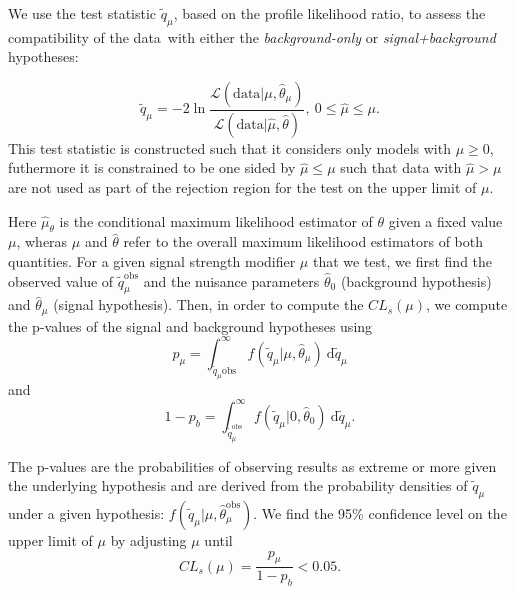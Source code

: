 We use the test statistic $\tilde{q}_\mu$, based on the profile likelihood ratio\cite{Cowan:2010js}, to assess the compatibility of the data with either the \textit{background-only} or \textit{signal+background} hypotheses:

\begin{equation}
\tilde{q}_\mu = -2 \ln{\frac{\mathcal{L}(\mathrm{data} | \mu, \hat{\theta}_\mu)}{\mathcal{L}(\mathrm{data} | \hat{\mu}, \hat{\theta})}},\ 0 \le \hat{\mu} \le \mu.
\end{equation}
This test statistic is constructed such that it considers only models with $\mu \ge 0$, futhermore it is constrained to be one sided by $\hat{\mu} \le \mu$ such that data with $\hat{\mu} > \mu$ are not used as part of the rejection region for the test on the upper limit of $\mu$.

Here $\hat{\mu}_\theta$ is the conditional maximum likelihood estimator of $\theta$ given a fixed value $\mu$, wheras $\hat{\mu}$ and $\hat{\theta}$ refer to the overall maximum likelihood estimators of both quantities. For a given signal strength modifier $\mu$ that we test, we first find the observed value of $\tilde{q}_\mu^{\mathrm{obs}}$ and the nuisance parameters $\hat{\theta}_0$ (background hypothesis) and $\hat{\theta}_\mu$ (signal hypothesis). Then, in order to compute the $CL_s(\mu)$, we compute the p-values of the signal and background hypotheses using
\begin{equation}
p_{\mu} = \int_{\tilde{q}_{\mu}{\mathrm{obs}}}^\infty f(\tilde{q}_{\mu} | \mu, \hat{\theta}_{\mu})\ \mathrm{d}\tilde{q}_\mu
\end{equation}
and
\begin{equation}
1 - p_b = \int_{\tilde{q}_{\mu}^{\mathrm{obs}}}^\infty f(\tilde{q}_{\mu} | 0, \hat{\theta}_0)\ \mathrm{d}\tilde{q}_{\mu}.
\end{equation}

The p-values are the probabilities of observing results as extreme or more given the underlying hypothesis and are derived from the probability densities of $\tilde{q}_{\mu}$ under a given hypothesis: $f(\tilde{q}_\mu | \mu, \hat{\theta}_\mu^{\mathrm{obs}})$. We find the 95\% confidence level on the upper limit of $\mu$ by adjusting $\mu$ until
\begin{equation}
CL_s(\mu) = \frac{p_\mu}{1 - p_b} < 0.05.
\end{equation}

